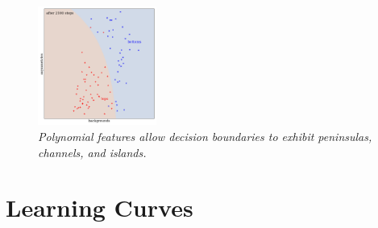 \documentclass[openany, notitlepage, justified]{tufte-book}
\newcommand{\Dd}{\mathcal{D}}
\newcommand{\Ll}{\mathcal{L}}
\begin{document}
\begin{figure}
                \includegraphics[height=3.9cm]{yo-13-bd}
                \caption{\emph{
                    Polynomial features allow decision boundaries to exhibit
                    peninsulas, channels, and islands.
                }}
            \end{figure}

        \section{Learning Curves}




\end{document}
